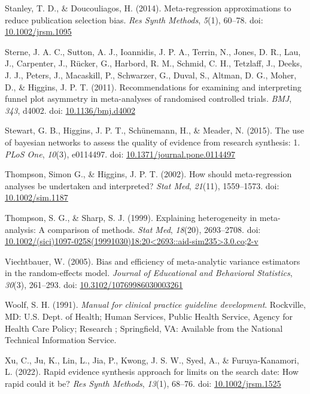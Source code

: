 \documentclass[
  letterpaper,
  DIV=11,
  numbers=noendperiod]{scrreprt}
\newlength{\cslhangindent}
\newlength{\cslentryspacingunit} %
\newenvironment{CSLReferences}[2] %
 {%
  \setlength{\parindent}{0pt}
  \ifodd #1
  \let\oldpar\par
  \def\par{\hangindent=\cslhangindent\oldpar}
  \fi
  \setlength{\parskip}{#2\cslentryspacingunit}
 }%
 {}
\begin{document}
\begin{CSLReferences}{1}{0}
\leavevmode{}%
Stanley, T. D., \& Doucouliagos, H. (2014). Meta-regression
approximations to reduce publication selection bias. \emph{Res Synth
Methods}, \emph{5}(1), 60--78. doi:
\href{https://doi.org/10.1002/jrsm.1095}{10.1002/jrsm.1095}

\leavevmode{}%
Sterne, J. A. C., Sutton, A. J., Ioannidis, J. P. A., Terrin, N., Jones,
D. R., Lau, J., Carpenter, J., Rücker, G., Harbord, R. M., Schmid, C.
H., Tetzlaff, J., Deeks, J. J., Peters, J., Macaskill, P., Schwarzer,
G., Duval, S., Altman, D. G., Moher, D., \& Higgins, J. P. T. (2011).
Recommendations for examining and interpreting funnel plot asymmetry in
meta-analyses of randomised controlled trials. \emph{BMJ}, \emph{343},
d4002. doi: \href{https://doi.org/10.1136/bmj.d4002}{10.1136/bmj.d4002}

\leavevmode{}%
Stewart, G. B., Higgins, J. P. T., Schünemann, H., \& Meader, N. (2015).
The use of bayesian networks to assess the quality of evidence from
research synthesis: 1. \emph{PLoS One}, \emph{10}(3), e0114497. doi:
\href{https://doi.org/10.1371/journal.pone.0114497}{10.1371/journal.pone.0114497}

\leavevmode{}%
Thompson, Simon G., \& Higgins, J. P. T. (2002). How should
meta-regression analyses be undertaken and interpreted? \emph{Stat Med},
\emph{21}(11), 1559--1573. doi:
\href{https://doi.org/10.1002/sim.1187}{10.1002/sim.1187}

\leavevmode{}%
Thompson, S. G., \& Sharp, S. J. (1999). Explaining heterogeneity in
meta-analysis: A comparison of methods. \emph{Stat Med}, \emph{18}(20),
2693--2708. doi:
\href{https://doi.org/10.1002/(sici)1097-0258(19991030)18:20\%3C2693::aid-sim235\%3E3.0.co;2-v}{10.1002/(sici)1097-0258(19991030)18:20\textless2693::aid-sim235\textgreater3.0.co;2-v}

\leavevmode{}%
Viechtbauer, W. (2005). Bias and efficiency of meta-analytic variance
estimators in the random-effects model. \emph{Journal of Educational and
Behavioral Statistics}, \emph{30}(3), 261--293. doi:
\href{https://doi.org/10.3102/10769986030003261}{10.3102/10769986030003261}

\leavevmode{}%
Woolf, S. H. (1991). \emph{Manual for clinical practice guideline
development}. Rockville, MD: U.S. Dept. of Health; Human Services,
Public Health Service, Agency for Health Care Policy; Research ;
Springfield, VA: Available from the National Technical Information
Service.

\leavevmode{}%
Xu, C., Ju, K., Lin, L., Jia, P., Kwong, J. S. W., Syed, A., \&
Furuya-Kanamori, L. (2022). Rapid evidence synthesis approach for limits
on the search date: How rapid could it be? \emph{Res Synth Methods},
\emph{13}(1), 68--76. doi:
\href{https://doi.org/10.1002/jrsm.1525}{10.1002/jrsm.1525}

\end{CSLReferences}
\end{document}
